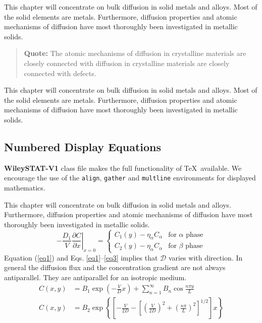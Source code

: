 \documentclass[cmbright]{WileySTAT-V1} %
\theoremstyle{plain}
\begin{document}
This chapter will concentrate on bulk diffusion in solid metals and alloys. Most of the solid elements are metals. Furthermore, diffusion properties and atomic mechanisms of diffusion have most thoroughly been investigated in metallic solids.
\begin{quote}
\textbf{Quote:} The atomic mechanisms of diffusion in crystalline materials are closely connected with diffusion in crystalline materials are closely connected with defects.
\end{quote}
This chapter will concentrate on bulk diffusion in solid metals and alloys. Most of the solid elements are metals. Furthermore, diffusion properties and atomic mechanisms of diffusion have most thoroughly been investigated in metallic solids.


\subsection{Numbered Display Equations}\label{sec4.4}

\textbf{WileySTAT-V1} class file makes the full functionality of \AmS\/\TeX\ available. We encourage the use of the \verb"align", \verb"gather" and \verb"multline" environments for displayed mathematics.

This chapter will concentrate on bulk diffusion in solid metals and alloys. Furthermore, diffusion properties and atomic mechanisms of diffusion have most thoroughly been investigated in metallic solids.
\begin{equation}\label{eq1}
 - \frac{D_1}{V} \left. \frac{\partial C}{\partial x} \right|_{x=0} =
 \begin{cases}
 C_1(y) - \eta_\alpha C_\alpha & \mbox{for $\alpha$ phase} \\
 C_2(y) - \eta_\alpha C_\alpha & \mbox{for $\beta$ phase}
 \end{cases}
\end{equation}
Equation (\ref{eq1}) and Eqs. \ref{eq1}--\ref{eq3} implies that $\mathcal{D}$ varies with direction. In general the diffusion flux and the concentration gradient are not always antiparallel. They are antiparallel for an isotropic medium.
\begin{align}\label{eq2}
 C(x,y) & = B_1\exp \left(-\frac{V}{D}x \right) + \sum_{n=1}^{\infty} B_n \cos \frac{n\pi y}{L} \\
 C(x,y) & = B_2\exp \left\{\left[-\frac{V}{2D} - \left[ \left(\frac{V}{2D} \right)^2 + \left(\frac{n\pi}{L} \right)^2 \right]^{1/2} \right] x \right\}
\end{align}
\end{document}
